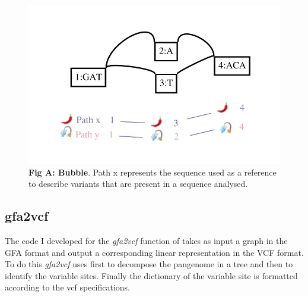 
\begin{figure}[H]
\centering
\includegraphics[width=1.00\textwidth]{fig/GraphchrXnew.pdf}
\decoRule
\caption{\textbf{Fig A: Bubble}. Path x represents the sequence used as a reference to describe variants that are present in a sequence analysed.} 
\label{fig:bubble.png}
\end{figure}




\setcounter{secnumdepth}{3}
\subsection{gfa2vcf}
The code I developed for the \textit{gfa2vcf} function of \vgp takes as input a graph in the GFA format and output a corresponding linear representation in the VCF format. To do this \textit{gfa2vcf} uses first \bbp to decompose the pangenome in a tree and then \bbc to identify the variable sites. Finally the dictionary of the variable site is formatted according to the vcf specifications. 

